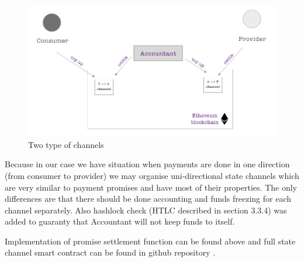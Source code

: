 \documentclass[a4paper,12pt]{article}
\begin{document}
\begin{figure}[H]
    \centering
    \includegraphics[scale=0.4]{../img/accountant-channels}
    \caption{Two type of channels}
    \label{img:accountant-channels}
\end{figure}

Because in our case we have situation when payments are done in one direction 
(from consumer to provider) we may organise uni-directional state channels 
which are very similar to payment promises and have most of their properties. 
The only differences are that there should be done accounting and funds freezing 
for each channel separately. Also hashlock check (HTLC described in section 
3.3.4) was added to guaranty that Accountant will not keep funds to itself.

Implementation of promise settlement function can be found above and full 
state channel smart contract can be found in github repository 
\cite{smartcontracts}.
\end{document}
